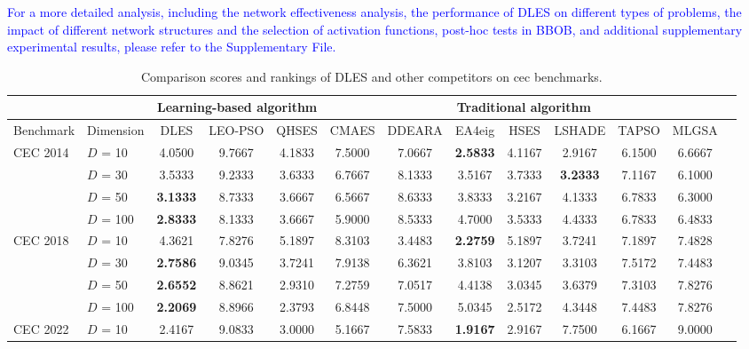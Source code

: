 \documentclass[journal,twoside]{IEEEtran}
\begin{document}
\textcolor{blue}{For a more detailed analysis, including the network effectiveness analysis, the performance of DLES on different types of problems, the impact of different network structures and the selection of activation functions, post-hoc tests in BBOB, and additional supplementary experimental results, please refer to the Supplementary File.}

\begin{table}[t]
	\centering
	\caption{Comparison scores and rankings of DLES and other competitors on cec benchmarks.}
	\vspace{-2mm}
	\label{frideall}
		\begin{tabular}{l|l|ccc|cccccccc}	
			\hline	
			\multicolumn{2}{c|}{ } & \multicolumn{3}{c|}{Learning-based algorithm} & \multicolumn{7}{c}{ Traditional algorithm}\\ 
			\hline																				
			Benchmark	&	Dimension	&	DLES	&	LEO-PSO	&	QHSES	&	CMAES	&	DDEARA	&	EA4eig	&	HSES	&	LSHADE	&	TAPSO	&	MLGSA	\\
			\hline																							
			\multirow{4}{*}{CEC 2014}	& 	$D$ = 10  	&	4.0500 	&	9.7667 	&	4.1833 	&	7.5000 	&	7.0667 	&	\textbf{2.5833}	&	4.1167 	&	2.9167 	&	6.1500 	&	6.6667 	\\
			& 	$D$ = 30 	&	3.5333 	&	9.2333 	&	3.6333 	&	6.7667 	&	8.1333 	&	3.5167 	&	3.7333 	&	\textbf{3.2333}	&	7.1167 	&	6.1000 	\\
			& 	$D$ = 50 	&	\textbf{3.1333}	&	8.7333 	&	3.6667 	&	6.5667 	&	8.6333 	&	3.8333 	&	3.2167 	&	4.1333 	&	6.7833 	&	6.3000 	\\
			& 	$D$ = 100 	&	\textbf{2.8333}	&	8.1333 	&	3.6667 	&	5.9000 	&	8.5333 	&	4.7000 	&	3.5333 	&	4.4333 	&	6.7833 	&	6.4833 	\\
			\hline																							
			\multirow{4}{*}{CEC 2018}	& 	$D$ = 10  	&	4.3621 	&	7.8276 	&	5.1897 	&	8.3103 	&	3.4483 	&	\textbf{2.2759}	&	5.1897 	&	3.7241 	&	7.1897 	&	7.4828 	\\
			& 	$D$ = 30 	&	\textbf{2.7586}	&	9.0345 	&	3.7241 	&	7.9138 	&	6.3621 	&	3.8103 	&	3.1207 	&	3.3103 	&	7.5172 	&	7.4483 	\\
			& 	$D$ = 50 	&	\textbf{2.6552}	&	8.8621 	&	2.9310 	&	7.2759 	&	7.0517 	&	4.4138 	&	3.0345 	&	3.6379 	&	7.3103 	&	7.8276 	\\
			& 	$D$ = 100 	&	\textbf{2.2069}	&	8.8966 	&	2.3793 	&	6.8448 	&	7.5000 	&	5.0345 	&	2.5172 	&	4.3448 	&	7.4483 	&	7.8276 	\\
			\hline																							
			\multirow{2}{*}{CEC 2022}	& 	$D$ = 10  	&	2.4167 	&	9.0833 	&	3.0000 	&	5.1667 	&	7.5833 	&	\textbf{1.9167}	&	2.9167 	&	7.7500 	&	6.1667 	&	9.0000 	\\

\end{tabular}
\end{table}
\end{document}
